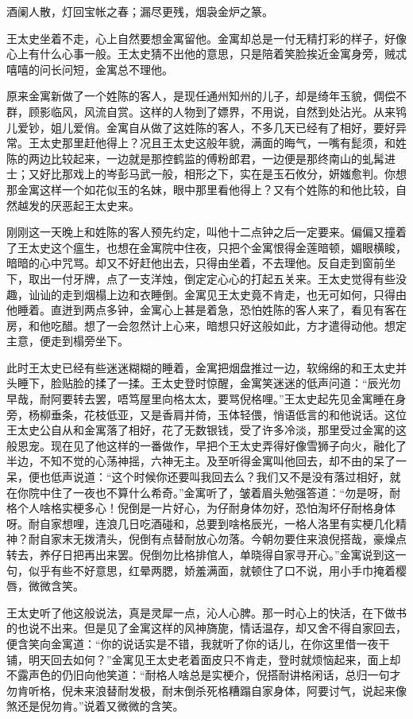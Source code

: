 \documentclass[12pt,UTF8]{ctexbook}
\begin{document}
{{{酒阑人散，灯回宝帐之春；漏尽更残，烟袅金炉之篆。

王太史坐着不走，心上自然要想金寓留他。金寓却总是一付无精打彩的样子，好像心上有什么心事一般。王太史猜不出他的意思，只是陪着笑脸挨近金寓身旁，贼忒嘻嘻的问长问短，金寓总不理他。

原来金寓新做了一个姓陈的客人，是现任通州知州的儿子，却是绮年玉貌，倜偿不群，顾影临风，风流自赏。这样的人物到了嫖界，不用说，自然到处沾光。从来鸨儿爱钞，姐儿爱俏。金寓自从做了这姓陈的客人，不多几天已经有了相好，要好异常。王太史那里赶他得上？况且王太史这般年貌，满面的晦气，一嘴有髭须，和姓陈的两边比较起来，一边就是那控鹤监的傅粉郎君，一边便是那终南山的虬髯进士；又好比那戏上的岑彭马武一般，相形之下，实在是玉石攸分，妍媸愈判。你想那金寓这样一个如花似玉的名妹，眼中那里看他得上？又有个姓陈的和他比较，自然越发的厌恶起王太史来。

刚刚这一天晚上和姓陈的客人预先约定，叫他十二点钟之后一定要来。偏偏又撞着了王太史这个瘟生，也想在金寓院中住夜，只把个金寓恨得金莲暗顿，媚眼横睃，暗暗的心中咒骂。却又不好赶他出去，只得由坐着，不去理他。反自走到窗前坐下，取出一付牙牌，点了一支洋烛，倒定定心心的打起五关来。王太史觉得有些没趣，讪讪的走到烟榻上边和衣睡倒。金寓见王太史竟不肯走，也无可如何，只得由他睡着。直迸到两点多钟，金寓心上甚是着急，恐怕姓陈的客人来了，看见有客在房，和他吃醋。想了一会忽然计上心来，暗想只好这般如此，方才遣得动他。想定主意，便走到榻旁坐下。

此时王太史已经有些迷迷糊糊的睡着，金寓把烟盘推过一边，软绵绵的和王太史并头睡下，脸贴脸的揉了一揉。王太史登时惊醒，金寓笑迷迷的低声问道：“辰光勿早哉，耐阿要转去罢，唔笃屋里向格太太，要骂倪格哩。”王太史起先见金寓睡在身旁，杨柳垂条，花枝低亚，又是香肩并倚，玉体轻偎，悄语低言的和他说话。这位王太史公自从和金寓落了相好，花了无数银钱，受了许多冷淡，那里受过金寓的这般恩宠。现在见了他这样的一番做作，早把个王太史弄得好像雪狮子向火，融化了半边，不知不觉的心荡神摇，六神无主。及至听得金寓叫他回去，却不由的呆了一呆，便也低声说道：“这个时候你还要叫我回去么？我们又不是没有落过相好，就在你院中住了一夜也不算什么希奇。”金寓听了，皱着眉头勉强答道：“勿是呀，耐格个人啥格实梗多心！倪倒是一片好心，为仔耐身体勿好，恐怕淘坏仔耐格身体呀。耐自家想哩，连浪几日吃酒碰和，总要到啥格辰光，一格人洛里有实梗几化精神？耐自家末无拨清头，倪倒有点替耐放心勿落。今朝勿要住来浪倪搭哉，豪燥点转去，养仔日把再出来罢。倪倒勿比格排倌人，单晓得自家寻开心。”金寓说到这一句，似乎有些不好意思，红晕两腮，娇羞满面，就顿住了口不说，用小手巾掩着樱唇，微微含笑。

王太史听了他这般说法，真是灵犀一点，沁人心脾。那一时心上的快活，在下做书的也说不出来。但是见了金寓这样的风神旖旎，情话温存，却又舍不得自家回去，便含笑向金寓道：“你的说话实是不错，我就听了你的话儿，在你这里借一夜干铺，明天回去如何？”金寓见王太史老着面皮只不肯走，登时就烦恼起来，面上却不露声色的仍旧向他笑道：“耐格人啥总是实梗介，倪搭耐讲格闲话，总归一句才勿肯听格，倪未来浪替耐发极，耐末倒杀死格糟蹋自家身体，阿要讨气，说起来像煞还是倪勿肯。”说着又微微的含笑。

}}}
\end{document}
